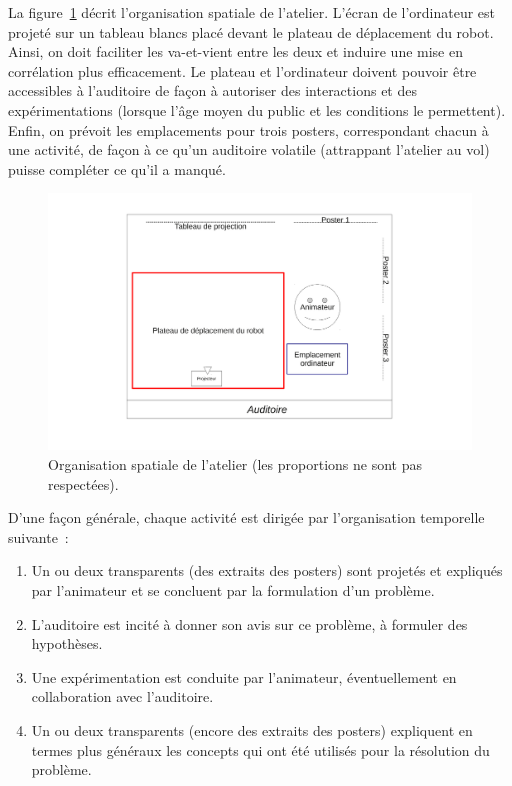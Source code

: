 \documentclass[11pt,a4paper]{article}
\begin{document}
La figure~\ref{fig:spatial-layout} décrit l'organisation spatiale de
l'atelier. L'écran de l'ordinateur est projeté sur un tableau blancs
placé devant le plateau de déplacement du robot. Ainsi, on doit
faciliter les va-et-vient entre les deux et induire une mise en
corrélation plus efficacement. Le plateau et l'ordinateur doivent
pouvoir être accessibles à l'auditoire de façon à autoriser des
interactions et des expérimentations (lorsque l'âge moyen du public et
les conditions le permettent). Enfin, on prévoit les emplacements pour
trois posters, correspondant chacun à une activité, de façon à ce
qu'un auditoire volatile (attrappant l'atelier au vol) puisse
compléter ce qu'il a manqué.

\begin{figure}
\begin{center}
\includegraphics[width=14cm]{images/spatial}
\end{center}
\caption{Organisation spatiale de l'atelier (les proportions ne sont pas respectées).}
\label{fig:spatial-layout}
\end{figure}

D'une façon générale, chaque activité est dirigée par l'organisation temporelle suivante~: 
\begin{enumerate}
\item Un ou deux transparents (des extraits des posters) sont projetés
  et expliqués par l'animateur et se concluent par la formulation d'un problème.

\item L'auditoire est incité à donner son avis sur ce problème, à formuler des hypothèses.

\item Une expérimentation est conduite par l'animateur, éventuellement en collaboration avec l'auditoire. 

\item Un ou deux transparents (encore des extraits des posters)
  expliquent en termes plus généraux les concepts qui ont été utilisés
  pour la résolution du problème.

\end{enumerate}
\end{document}
